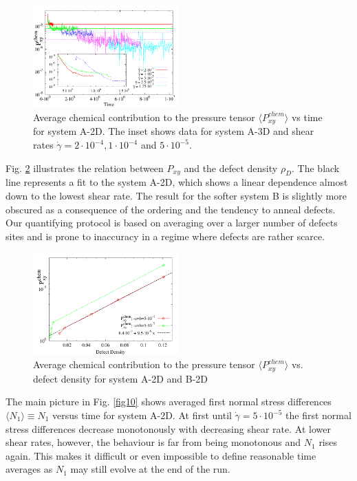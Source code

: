 \documentclass[8.5pt,twoside,twocolumn]{article}
\newcommand{\e}[1]{\cdot10^{#1}}
\newcommand{\gd}{\dot{\gamma}}
\begin{document}
\begin{figure}[htp!]
\centering
\includegraphics[angle=0,width=0.5\textwidth]{P_xy_chem_t_5e-4.pdf}
\caption{Average chemical contribution to the pressure tensor $\langle P_{xy}^{chem}\rangle$ vs time for system A-2D. The inset shows data for system A-3D and shear rates $\dot{\gamma}=2\cdot10^{-4}, 1\cdot10^{-4}$ and $5\cdot10^{-5}$.}
\label{fig8}
\end{figure}

Fig. \ref{fig9} illustrates the relation between $P_{xy}$ and the defect density $\rho_D$.
The black line represents a fit to the system A-2D, which shows a linear dependence almost down to the lowest shear rate.
The result for the softer system B is slightly more obscured as a consequence of the ordering and the tendency to anneal defects.
Our quantifying protocol is based on averaging over a larger number of defects sites and is prone to inaccuracy in a regime where defects are rather scarce.

\begin{figure}[htp!]
\centering
\includegraphics[angle=0,width=0.5\textwidth]{P_xy_defect_density.pdf}
\caption{Average chemical contribution to the pressure tensor $\langle P_{xy}^{chem}\rangle$ vs. defect density for system A-2D and B-2D } 
\label{fig9}
\end{figure}

The main picture in Fig. \ref{fig10} shows averaged first normal stress differences $\langle N_1\rangle \equiv N_1$ versus time for system A-2D.
At first until $\gd=5\e{-5}$ the first normal stress differences decrease monotonously with decreasing shear rate.
At lower shear rates, however, the behaviour is far from being monotonous and $N_1$ rises again.
This makes it difficult or even impossible to define reasonable time averages as $N_1$ may still evolve at the end of the run.
\end{document}
